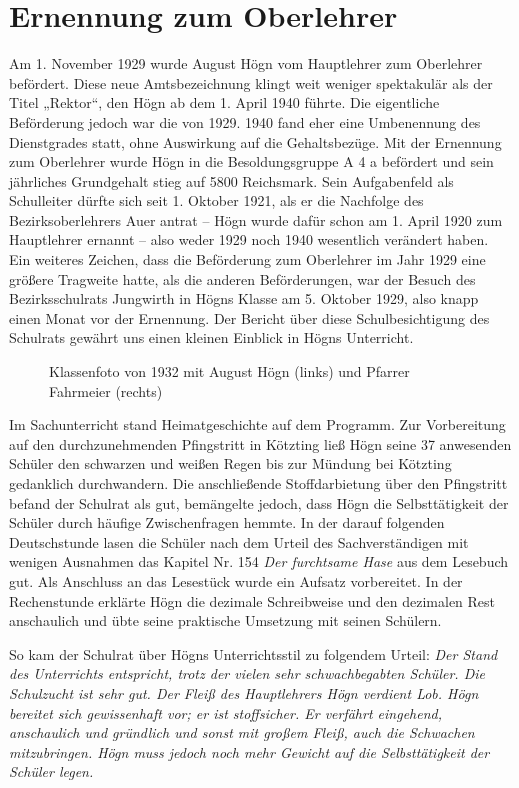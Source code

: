 \section{Ernennung zum Oberlehrer}

Am 1. November 1929 wurde August Högn vom Hauptlehrer zum Oberlehrer
befördert. Diese neue Amtsbezeichnung klingt weit weniger spektakulär
als der Titel „Rektor“, den Högn ab dem 1. April 1940 führte. Die
eigentliche Beförderung jedoch war die von 1929. 1940 fand eher eine
Umbenennung des Dienstgrades statt, ohne Auswirkung auf die
Gehaltsbezüge. Mit der Ernennung zum Oberlehrer wurde Högn in die
Besoldungsgruppe A 4 a befördert und sein jährliches Grundgehalt stieg
auf 5800 Reichsmark. Sein Aufgabenfeld als Schulleiter dürfte sich
seit 1. Oktober 1921, als er die Nachfolge des Bezirksoberlehrers Auer
antrat – Högn wurde dafür schon am 1. April 1920 zum Hauptlehrer
ernannt – also weder 1929 noch 1940 wesentlich verändert haben. Ein
weiteres Zeichen, dass die Beförderung zum Oberlehrer im Jahr 1929 eine
größere Tragweite hatte, als die anderen Beförderungen, war der
Besuch des Bezirksschulrats Jungwirth in Högns Klasse am 5. Oktober
1929, also knapp einen Monat vor der Ernennung. Der Bericht über diese
Schulbesichtigung des Schulrats gewährt uns einen kleinen Einblick in
Högns Unterricht.

\begin{figure}
\caption{Klassenfoto von 1932 mit August Högn (links) und Pfarrer
Fahrmeier (rechts)}
\end{figure}

Im Sachunterricht stand Heimatgeschichte auf dem Programm. Zur
Vorbereitung auf den durchzunehmenden Pfingstritt in Kötzting ließ
Högn seine 37 anwesenden Schüler den schwarzen und weißen Regen bis zur
Mündung bei Kötzting gedanklich durchwandern. Die anschließende
Stoffdarbietung über den Pfingstritt befand der Schulrat als gut,
bemängelte jedoch, dass Högn die Selbsttätigkeit der Schüler durch
häufige Zwischenfragen hemmte. In der darauf folgenden Deutschstunde
lasen die Schüler nach dem Urteil des Sachverständigen mit wenigen
Ausnahmen das Kapitel Nr. 154 \textit{Der furchtsame Hase} aus dem
Lesebuch gut. Als Anschluss an das Lesestück wurde ein Aufsatz
vorbereitet. In der Rechenstunde erklärte Högn die dezimale
Schreibweise und den dezimalen Rest anschaulich und übte seine
praktische Umsetzung mit seinen Schülern.

So kam der Schulrat über Högns Unterrichtsstil zu folgendem Urteil:
\textit{Der Stand des Unterrichts entspricht, trotz der vielen sehr
schwachbegabten Schüler. Die Schulzucht ist sehr gut. Der Fleiß des
Hauptlehrers Högn verdient Lob. Högn bereitet sich gewissenhaft vor;
er ist stoffsicher. Er verfährt eingehend, anschaulich und gründlich
und sonst mit großem Fleiß, auch die Schwachen mitzubringen. Högn muss
jedoch noch mehr Gewicht auf die Selbsttätigkeit der Schüler legen.}

